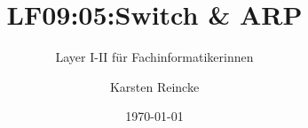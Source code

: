\documentclass[]{beamer}
\title{LF09:05:Switch \& ARP }
\subtitle{Layer I-II für Fachinformatikerinnen}
\institute{GS-LDK}
\author{Karsten Reincke}
\date{\today}
\def\cfgGl{../../../cfg.gl/}
\begin{document}

\begin{frame}
  \titlepage
\end{frame}






\logo{}
\newpage



%
\end{document}

